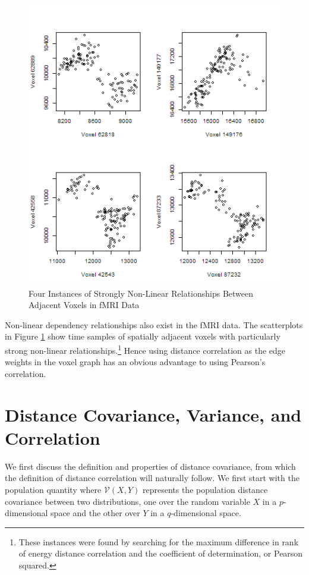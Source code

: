 \begin{figure}
\caption{Four Instances of Strongly Non-Linear Relationships Between %
Adjacent Voxels in fMRI Data}
\label{fmri_nonlinear}
\includegraphics[scale = 0.7]{figs/1_nonlinear_ABIDE_50002.png}
\end{figure}

Non-linear dependency relationships also exist in the fMRI data. The
scatterplots in Figure \ref{fmri_nonlinear} show time samples of
spatially adjacent voxels with particularly strong non-linear
relationships.\footnote{These instances were found by searching for the
maximum difference in rank of energy distance correlation and the
coefficient of determination, or Pearson squared.} Hence using distance
correlation as the edge weights in the voxel graph has an obvious
advantage to using Pearson's correlation.

\section{Distance Covariance, Variance, and Correlation}

We first discuss the definition and properties of distance covariance,
from which the definition of distance correlation will naturally
follow. We first start with the population quantity where
$\mathcal{V}(X,Y)$ represents the population distance covariance
between two distributions, one over the random variable $X$ in a
$p$-dimensional space and the other over $Y$ in a $q$-dimensional
space.

